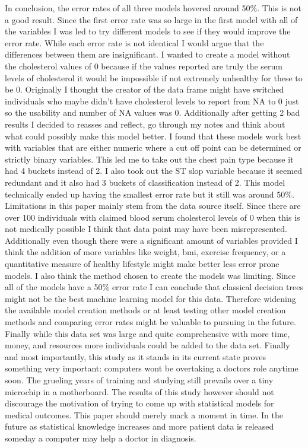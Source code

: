 \documentclass[12pt]{article}
\begin{document}
In conclusion, the error rates of all three models hovered around 50\%. This is not a good result. Since the first error rate was so large in the first model with all of the variables I was led to try different models to see if they would improve the error rate. While each error rate is not identical I would argue that the differences between them are insignificant. I wanted to create a model without the cholesterol values of 0 because if the values reported are truly the serum levels of cholesterol it would be impossible if not extremely unhealthy for these to be 0. Originally I thought the creator of the data frame might have switched individuals who maybe didn’t have cholesterol levels to report from NA to 0 just so the usability and number of NA values was 0. Additionally after getting 2 bad results I decided to reasses and reflect, go through my notes and think about what could possibly make this model better. I found that these models work best with variables that are either numeric where a cut off point can be determined or strictly binary variables. This led me to take out the chest pain type because it had 4 buckets instead of 2. I also took out the ST slop variable because it seemed redundant and it also had 3 buckets of classification instead of 2. This model technically ended up having the smallest error rate but it still was around 50\%. 
Limitations in this paper mainly stem from the data source itself. Since there are over 100 individuals with claimed blood serum cholesterol levels of 0 when this is not medically possible I think that data point may have been misrepresented. Additionally even though there were a significant amount of variables provided I think the addition of more variables like weight, bmi, exercise frequency, or a quantitative measure of healthy lifestyle might make better less error prone models. I also think the method chosen to create the models was limiting. Since all of the models have a 50\% error rate I can conclude that classical decision trees might not be the best machine learning model for this data. Therefore widening the available model creation methods or at least testing other model creation methods and comparing error rates might be valuable to pursuing in the future. Finally while this data set was large and quite comprehensive with more time, money, and resources more individuals could be added to the data set.
Finally and most importantly, this study as it stands in its current state proves something very important: computers won\textsc{}t be overtaking a doctor\textsc{}s role anytime soon. The grueling years of training and studying still prevails over a tiny microchip in a motherboard. The results of this study however should not discourage the motivation of trying to come up with statistical models for medical outcomes. This paper should merely mark a moment in time. In the future as statistical knowledge increases and more patient data is released someday a computer may help a doctor in diagnosis.


%
%
\end{document}
